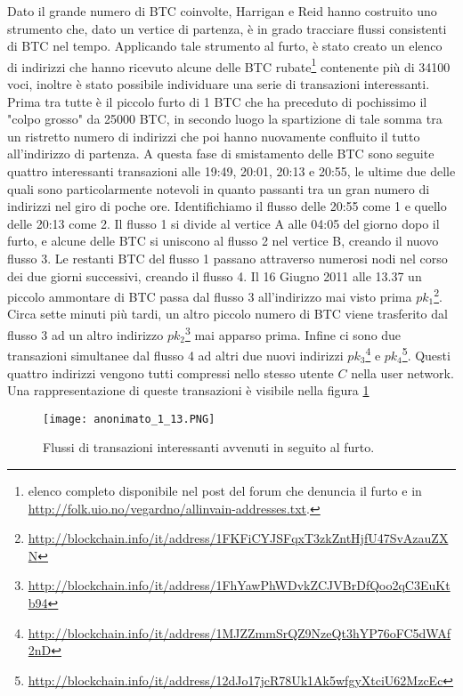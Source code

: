 Dato il grande numero di BTC coinvolte, Harrigan e Reid hanno costruito uno strumento che, dato un vertice di partenza, è in grado tracciare flussi consistenti di BTC nel tempo.
Applicando tale strumento al furto, è stato creato un elenco di indirizzi che hanno ricevuto alcune delle BTC rubate\footnote{elenco completo disponibile nel post del forum che denuncia il furto e in \url{http://folk.uio.no/vegardno/allinvain-addresses.txt}.} contenente più di 34100 voci, inoltre è stato possibile individuare una serie di transazioni interessanti.
Prima tra tutte è il piccolo furto di 1 BTC che ha preceduto di pochissimo il "colpo grosso" da 25000 BTC, in secondo luogo la spartizione di tale somma tra un ristretto numero di indirizzi che poi hanno nuovamente confluito il tutto all'indirizzo di partenza.
A questa fase di smistamento delle BTC sono seguite quattro interessanti transazioni alle 19:49, 20:01, 20:13 e 20:55, le ultime due delle quali sono particolarmente notevoli in quanto passanti tra un gran numero di indirizzi nel giro di poche ore.
Identifichiamo il flusso delle 20:55 come 1 e quello delle 20:13 come 2. Il flusso 1 si divide al vertice A alle 04:05 del giorno dopo il furto, e alcune delle BTC si uniscono al flusso 2 nel vertice B, creando il nuovo flusso 3. Le restanti BTC del flusso 1 passano attraverso numerosi nodi nel corso dei due giorni successivi, creando il flusso 4.
Il 16 Giugno 2011 alle 13.37 un piccolo ammontare di BTC passa dal flusso 3 all'indirizzo mai visto prima $pk_1$\footnote{\url{http://blockchain.info/it/address/1FKFiCYJSFqxT3zkZntHjfU47SvAzauZXN}}. Circa sette minuti più tardi, un altro piccolo numero di BTC viene trasferito dal flusso 3 ad un altro indirizzo $pk_2$\footnote{\url{http://blockchain.info/it/address/1FhYawPhWDvkZCJVBrDfQoo2qC3EuKtb94}} mai apparso prima. Infine ci sono due transazioni simultanee dal flusso 4 ad altri due nuovi indirizzi $pk_3$\footnote{\url{http://blockchain.info/it/address/1MJZZmmSrQZ9NzeQt3hYP76oFC5dWAf2nD}} e $pk_4$\footnote{\url{http://blockchain.info/it/address/12dJo17jcR78Uk1Ak5wfgyXtciU62MzcEc}}. Questi quattro indirizzi vengono tutti compressi nello stesso utente $C$ nella user network. Una rappresentazione di queste transazioni è visibile nella figura \ref{anonimato_1_13}

\begin{figure}[htbp]
\centering
\texttt{[image: anonimato\_1\_13.PNG]}
\caption[Transazioni conseguenti il furto]{Flussi di transazioni interessanti avvenuti in seguito al furto.\label{anonimato_1_13}}
\end{figure}

